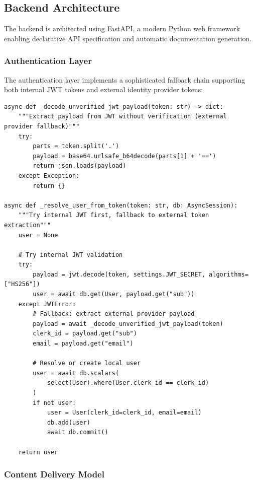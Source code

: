 \documentclass[10pt,conference,compsocconf]{IEEEtran}
\begin{document}
\subsection{Backend Architecture}

The backend is architected using FastAPI, a modern Python web framework enabling declarative API specification and automatic documentation generation.

\subsubsection{Authentication Layer}

The authentication layer implements a sophisticated fallback chain supporting both internal JWT tokens and external identity provider tokens:

\begin{lstlisting}[caption=Authentication Fallback Chain, label=lst:auth]
async def _decode_unverified_jwt_payload(token: str) -> dict:
    """Extract payload from JWT without verification (external provider fallback)"""
    try:
        parts = token.split('.')
        payload = base64.urlsafe_b64decode(parts[1] + '==')
        return json.loads(payload)
    except Exception:
        return {}

async def _resolve_user_from_token(token: str, db: AsyncSession):
    """Try internal JWT first, fallback to external token extraction"""
    user = None
    
    # Try internal JWT validation
    try:
        payload = jwt.decode(token, settings.JWT_SECRET, algorithms=["HS256"])
        user = await db.get(User, payload.get("sub"))
    except JWTError:
        # Fallback: extract external provider payload
        payload = await _decode_unverified_jwt_payload(token)
        clerk_id = payload.get("sub")
        email = payload.get("email")
        
        # Resolve or create local user
        user = await db.scalars(
            select(User).where(User.clerk_id == clerk_id)
        )
        if not user:
            user = User(clerk_id=clerk_id, email=email)
            db.add(user)
            await db.commit()
    
    return user
\end{lstlisting}

\subsubsection{Content Delivery Model}
\end{document}
